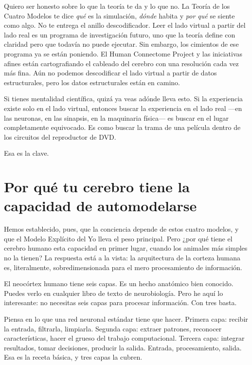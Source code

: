 \documentclass[11pt, twoside, openright]{book}
\begin{document}
Quiero ser honesto sobre lo que la teoría te da y lo que no. La Teoría de los Cuatro Modelos te dice \textit{qué} es la simulación, \textit{dónde} habita y \textit{por qué} se siente como algo. No te entrega el anillo descodificador. Leer el lado virtual a partir del lado real es un programa de investigación futuro, uno que la teoría define con claridad pero que todavía no puede ejecutar. Sin embargo, los cimientos de ese programa ya se están poniendo. El Human Connectome Project y las iniciativas afines están cartografiando el cableado del cerebro con una resolución cada vez más fina. Aún no podemos descodificar el lado virtual a partir de datos estructurales, pero los datos estructurales están en camino.

Si tienes mentalidad científica, quizá ya veas adónde lleva esto. Si la experiencia existe solo en el lado virtual, entonces buscar la experiencia en el lado real ---en las neuronas, en las sinapsis, en la maquinaria física--- es buscar en el lugar completamente equivocado. Es como buscar la trama de una película dentro de los circuitos del reproductor de DVD.

Esa es la clave.

\section*{Por qué tu cerebro tiene la capacidad de automodelarse}

Hemos establecido, pues, que la conciencia depende de estos cuatro modelos, y que el Modelo Explícito del Yo lleva el peso principal. Pero ¿por qué tiene el cerebro humano esta capacidad en primer lugar, cuando los animales más simples no la tienen? La respuesta está a la vista: la arquitectura de la corteza humana es, literalmente, sobredimensionada para el mero procesamiento de información.

El neocórtex humano tiene seis capas. Es un hecho anatómico bien conocido. Puedes verlo en cualquier libro de texto de neurobiología. Pero he aquí lo interesante: no necesitas seis capas para procesar información. Con tres basta.

Piensa en lo que una red neuronal estándar tiene que hacer. Primera capa: recibir la entrada, filtrarla, limpiarla. Segunda capa: extraer patrones, reconocer características, hacer el grueso del trabajo computacional. Tercera capa: integrar resultados, tomar decisiones, producir la salida. Entrada, procesamiento, salida. Esa es la receta básica, y tres capas la cubren.
\end{document}
